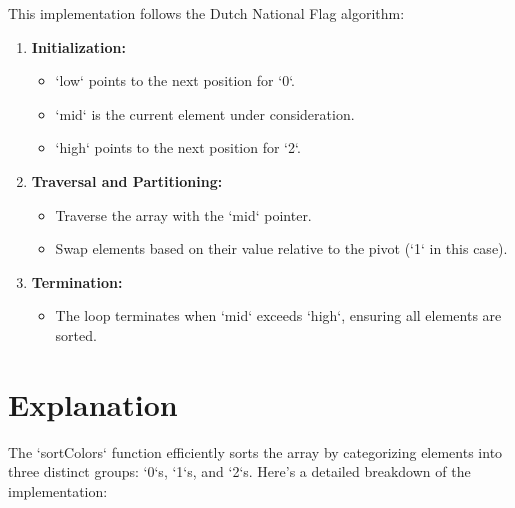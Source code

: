 This implementation follows the Dutch National Flag algorithm:
\begin{enumerate}
    \item \textbf{Initialization:}
    \begin{itemize}
        \item `low` points to the next position for `0`.
        \item `mid` is the current element under consideration.
        \item `high` points to the next position for `2`.
    \end{itemize}
    
    \item \textbf{Traversal and Partitioning:}
    \begin{itemize}
        \item Traverse the array with the `mid` pointer.
        \item Swap elements based on their value relative to the pivot (`1` in this case).
    \end{itemize}
    
    \item \textbf{Termination:}
    \begin{itemize}
        \item The loop terminates when `mid` exceeds `high`, ensuring all elements are sorted.
    \end{itemize}
\end{enumerate}

\section*{Explanation}
The `sortColors` function efficiently sorts the array by categorizing elements into three distinct groups: `0`s, `1`s, and `2`s. Here's a detailed breakdown of the implementation:

